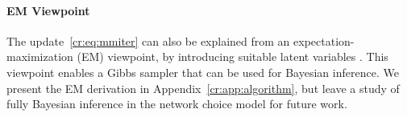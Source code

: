 \paragraph{EM Viewpoint}
The update~\eqref{cr:eq:mmiter} can also be explained from an expectation-maximization (EM) viewpoint, by introducing suitable latent variables \citep{caron2012efficient}.
This viewpoint enables a Gibbs sampler that can be used for Bayesian inference.
We present the EM derivation in Appendix~\ref{cr:app:algorithm}, but leave a study of fully Bayesian inference in the network choice model for future work.

